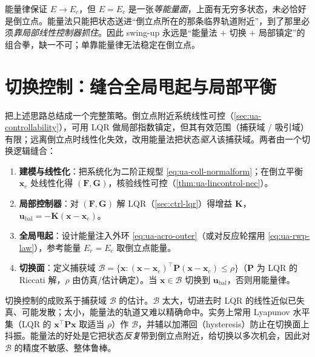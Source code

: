\begin{pitfall}
能量律保证 $E\to E_c$，但 $E=E_c$ 是一张\emph{等能量面}，上面有无穷多状态，未必恰好是倒立点。能量法只能把状态送进“倒立点所在的那条临界轨道附近”，到了那里必须\emph{靠局部线性控制器抓住}。因此 swing-up 永远是“能量法 $+$ 切换 $+$ 局部镇定”的组合拳，缺一不可；单靠能量律无法稳定在倒立点。
\end{pitfall}

\section{切换控制：缝合全局甩起与局部平衡}\label{sec:ua-switching}

把上述思路总结成一个完整策略。倒立点附近系统线性可控（\cref{sec:ua-controllability}），可用 LQR 做局部指数镇定，但其有效范围（捕获域 / 吸引域）有限；远离倒立点时线性化失效，改用能量法把状态\emph{驱入}该捕获域。两者由一个切换逻辑缝合：

\begin{algo}\label{algo:ua-switch}
\begin{enumerate}
  \item \textbf{建模与线性化}：把系统化为二阶正规型 \cref{eq:ua-coll-normalform}；在倒立平衡 $\mathbf{x}_e$ 处线性化得 $(\mathbf{F},\mathbf{G})$，核验线性可控（\cref{thm:ua-lincontrol-nec}）。
  \item \textbf{局部控制器}：对 $(\mathbf{F},\mathbf{G})$ 解 LQR（\cref{sec:ctrl-lqr}）得增益 $\mathbf{K}$，$\mathbf{u}_{\mathrm{bal}}=-\mathbf{K}(\mathbf{x}-\mathbf{x}_e)$。
  \item \textbf{全局甩起}：设计能量注入外环 \cref{eq:ua-acro-outer}（或对反应轮摆用 \cref{eq:ua-rwp-law}），参考能量 $E_r=E_c$ 取倒立点能量。
  \item \textbf{切换面}：定义捕获域 $\mathcal{B}=\{\mathbf{x}\colon (\mathbf{x}-\mathbf{x}_e)^\top\mathbf{P}(\mathbf{x}-\mathbf{x}_e)\le\rho\}$（$\mathbf{P}$ 为 LQR 的 Riccati 解，$\rho$ 由仿真/估计确定）。当 $\mathbf{x}\in\mathcal{B}$ 切换到 $\mathbf{u}_{\mathrm{bal}}$，否则用能量律。
\end{enumerate}
\end{algo}

\begin{insight}
切换控制的成败系于捕获域 $\mathcal{B}$ 的估计。$\mathcal{B}$ 太大，切进去时 LQR 的线性近似已失真、可能发散；太小，能量法的轨道又难以精确命中。实务上常用 Lyapunov 水平集（LQR 的 $\mathbf{x}^\top\mathbf{P}\mathbf{x}$ 取适当 $\rho$）作 $\mathcal{B}$，并辅以加滞回（hysteresis）防止在切换面上抖振。能量法的好处是它把状态\emph{反复}带到倒立点附近，给切换以多次机会，因此对 $\mathcal{B}$ 的精度不敏感、整体鲁棒。
\end{insight}

